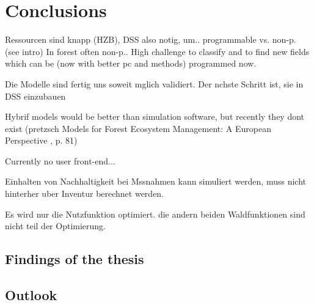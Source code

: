 \chapter{Conclusions}
\label{chap:discussion}
Ressourcen sind knapp (HZB), DSS also notig, um..
programmable vs. non-p. (see intro) In forest often non-p.. High challenge to classify and to find new fields which can be (now with better pc and methods) programmed now.

Die Modelle sind fertig uns soweit mglich validiert. Der nchste Schritt ist, sie in DSS einzubauen

Hybrif models would be better than simulation software, but recently they dont exist (pretzsch Models for Forest Ecosystem Management: A European Perspective
, p. 81)

Currently no user front-end...

Einhalten von Nachhaltigkeit bei Mssnahmen kann simuliert werden, muss nicht hinterher uber Inventur berechnet werden.

Es wird nur die Nutzfunktion optimiert. die andern beiden Waldfunktionen sind nicht teil der Optimierung.
\section{Findings of the thesis}
\label{sec:discussion:findings}
\section{Outlook}
\label{sec:discussion:outlook}